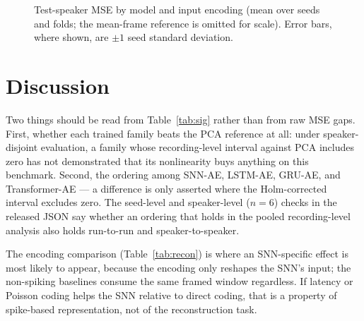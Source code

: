 \documentclass[conference]{IEEEtran}
\begin{document}
\begin{table}[!t]
\caption{Recording-level paired analysis on the test speakers. $\overline{d_r}$
is the mean per-recording MSE difference (model $-$ reference); a negative value
favours the model. CI is a $95\%$ bootstrap interval over recordings;
$p_{\text{Holm}}$ is the Holm-corrected Wilcoxon signed-rank $p$-value.}
\centering\small

\label{tab:sig}
\end{table}

\begin{figure}[!t]
  \centering
  
  \caption{Test-speaker MSE by model and input encoding (mean over seeds and
  folds; the mean-frame reference is omitted for scale). Error bars, where
  shown, are $\pm1$ seed standard deviation.}
  \label{fig:results}
\end{figure}

\section{Discussion}
\label{sec:discussion}

\par Two things should be read from Table~\ref{tab:sig} rather than from raw MSE
gaps. First, whether each trained family beats the PCA reference at all: under
speaker-disjoint evaluation, a family whose recording-level interval against PCA
includes zero has not demonstrated that its nonlinearity buys anything on this
benchmark. Second, the ordering among SNN-AE, LSTM-AE, GRU-AE, and Transformer-AE
--- a difference is only asserted where the Holm-corrected interval excludes
zero. The seed-level and speaker-level ($n=6$) checks in the released JSON say
whether an ordering that holds in the pooled recording-level analysis also holds
run-to-run and speaker-to-speaker.

\par The encoding comparison (Table~\ref{tab:recon}) is where an SNN-specific
effect is most likely to appear, because the encoding only reshapes the SNN's
input; the non-spiking baselines consume the same framed window regardless. If
latency or Poisson coding helps the SNN relative to direct coding, that is a
property of spike-based representation, not of the reconstruction task.
\end{document}
